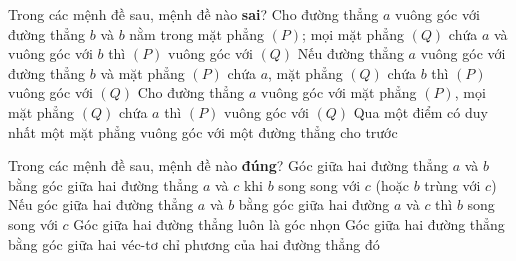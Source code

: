 \begin{ex}%
	Trong các mệnh đề sau, mệnh đề nào \textbf{sai}?
	\choice
	{Cho đường thẳng $a$ vuông góc với đường thẳng $b$ và $b$ nằm trong mặt phẳng $(P)$; mọi mặt phẳng $(Q)$ chứa $a$ và vuông góc với $b$ thì $(P)$ vuông góc với $(Q)$}
	{\True Nếu đường thẳng $a$ vuông góc với đường thẳng $b$ và mặt phẳng $(P)$ chứa $a$, mặt phẳng $(Q)$ chứa $b$ thì $(P)$ vuông góc với $(Q)$}
	{Cho đường thẳng $a$ vuông góc với mặt phẳng $(P)$, mọi mặt phẳng $(Q)$ chứa $a$ thì $(P)$ vuông góc với $(Q)$}
	{Qua một điểm có duy nhất một mặt phẳng vuông góc với một đường thẳng cho trước}
\end{ex}

\begin{ex}%
	Trong các mệnh đề sau, mệnh đề nào \textbf{đúng}?
	\choice
	{\True Góc giữa hai đường thẳng $a$ và $b$ bằng góc giữa hai đường thẳng $a$ và $c$ khi $b$ song song với $c$ (hoặc $b$ trùng với $c$)}
	{Nếu góc giữa hai đường thẳng $a$ và $b$ bằng góc giữa hai đường $a$ và $c$ thì $b$ song song với $c$}
	{Góc giữa hai đường thẳng luôn là góc nhọn}
	{Góc giữa hai đường thẳng bằng góc giữa hai véc-tơ chỉ phương của hai đường thẳng đó}
\end{ex}

